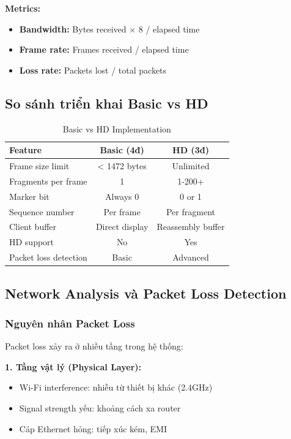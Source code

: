 \textbf{Metrics:}
\begin{itemize}
    \item \textbf{Bandwidth:} Bytes received $\times$ 8 / elapsed time
    \item \textbf{Frame rate:} Frames received / elapsed time
    \item \textbf{Loss rate:} Packets lost / total packets
\end{itemize}

\subsection{So sánh triển khai Basic vs HD}

\begin{table}[H]
\centering
\begin{tabular}{|l|c|c|}
\hline
\textbf{Feature} & \textbf{Basic (4đ)} & \textbf{HD (3đ)} \\
\hline
Frame size limit & < 1472 bytes & Unlimited \\
Fragments per frame & 1 & 1-200+ \\
Marker bit & Always 0 & 0 or 1 \\
Sequence number & Per frame & Per fragment \\
Client buffer & Direct display & Reassembly buffer \\
HD support & No & Yes \\
Packet loss detection & Basic & Advanced \\
\hline
\end{tabular}
\caption{Basic vs HD Implementation}
\end{table}

\subsection{Network Analysis và Packet Loss Detection}

\subsubsection{Nguyên nhân Packet Loss}

Packet loss xảy ra ở nhiều tầng trong hệ thống:

\textbf{1. Tầng vật lý (Physical Layer):}
\begin{itemize}
    \item Wi-Fi interference: nhiễu từ thiết bị khác (2.4GHz)
    \item Signal strength yếu: khoảng cách xa router
    \item Cáp Ethernet hỏng: tiếp xúc kém, EMI
\end{itemize}

